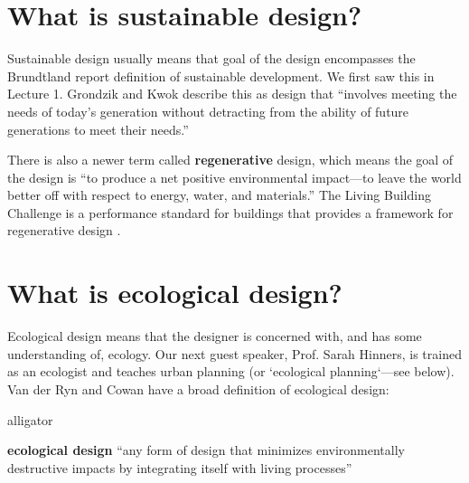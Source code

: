 \documentclass[10pt]{article}
\begin{document}
\section{What is sustainable design?}

{}

\medskip

Sustainable design usually means that goal of the design encompasses the Brundtland report \cite{bruntland} definition of sustainable development. We first saw this in Lecture 1. Grondzik and Kwok describe this as design that ``involves meeting the needs of today's generation
without detracting from the ability of future generations
to meet their needs.'' \cite{Grondzik2014-gt}

There is also a newer term called \textbf{regenerative} design, which means the goal of the design is ``to produce a net positive environmental
impact---to leave the world better off with respect to
energy, water, and materials.'' \cite{Grondzik2014-gt} The Living Building Challenge is a performance standard for buildings that provides a framework for regenerative design \cite{noauthor_2016-ep}.



\section{What is ecological design?}

{}

\medskip

Ecological design means that the designer is concerned with, and has some understanding of, ecology. Our next guest speaker, Prof. Sarah Hinners, is trained as an ecologist and teaches urban planning (or `ecological planning`---see below).  Van der Ryn and Cowan have a broad definition of ecological design:
\begin{labeling}{alligator}
\item [\textbf{ecological design}] ``any form of design that minimizes environmentally destructive impacts by integrating itself with living processes'' \cite{Van_der_Ryn2013-by}
\end{labeling}
\end{document}
